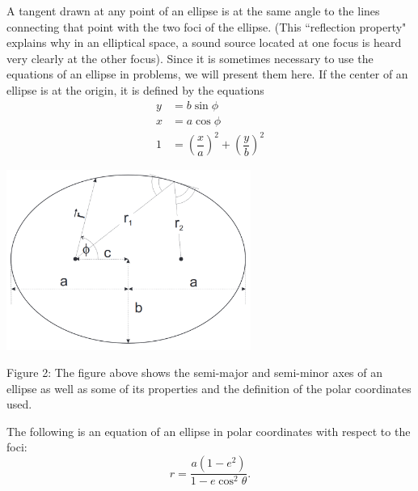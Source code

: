 \documentclass[11pt]{article}
\begin{document}
A tangent drawn at any point of an ellipse is at the same angle to the lines connecting that point with the two foci of the ellipse. (This ``reflection property" explains why in an elliptical space, a sound source located at one focus is heard very clearly at the other focus). Since it is sometimes necessary to use the equations of an ellipse in problems, we will present them here. If the center of an ellipse is at the origin, it is defined by the equations
\begin{align*}
    y&=b\sin\phi \\
    x&=a\cos\phi \\
    1&=\left(\dfrac{x}{a}\right)^2+\left(\dfrac{y}{b}\right)^2
\end{align*}
\begin{center}
    \includegraphics[width=0.6\textwidth]{Images/CM2.png}
    
    Figure 2: The figure above shows the semi-major and semi-minor axes of an ellipse as well as some of its properties and the definition of the polar coordinates used.
\end{center} %
The following is an equation of an ellipse in polar coordinates with respect to the foci:
$$r=\dfrac{a(1-e^2)}{1-e\cos^2\theta}.$$
\vspace{-10mm}
\end{document}
